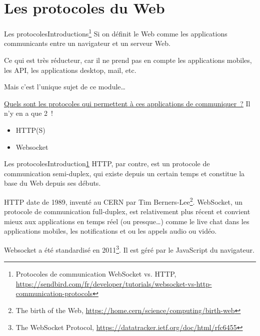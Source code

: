 \documentclass{beamer}
\begin{document}
    \section{Les protocoles du Web}\label{sec:protocoles}

    \begin{frame}{Les protocoles}{Introductions\footnote{\label{sendbird-protocole}Protocoles de communication WebSocket vs. HTTP, \url{https://sendbird.com/fr/developer/tutorials/websocket-vs-http-communication-protocols}}}
        Si on définit le Web comme les applications communicants entre un navigateur et un serveur Web.
        \begin{dangercolorbox}
            Ce qui est très réducteur, car il ne prend pas en compte les applications mobiles, les API, les applications desktop, mail, etc.

            Mais c'est l'unique sujet de ce module\ldots
        \end{dangercolorbox}
        \href{https://app.wooclap.com/events/NUDMYH/questions/68d2fb6cbbf6a5629eb98f90}{Quels sont les protocoles qui permettent à ces applications de communiquer~?}
        \pause
        \bigbreak
        Il n'y en a que 2~!
        \begin{itemize}
            \item HTTP(S)
            \item Websocket
        \end{itemize}
    \end{frame}

    \begin{frame}{Les protocoles}{Introduction\cref{sendbird-protocole}}
        HTTP, par contre, est un protocole de communication semi-duplex, qui existe depuis un certain temps et constitue la base du Web depuis ses débuts.

        HTTP date de 1989, inventé au CERN par Tim Berners-Lee\footnote{The birth of the Web, \url{https://home.cern/science/computing/birth-web}}.
        \bigbreak
        WebSocket, un protocole de communication full-duplex, est relativement plus récent et convient mieux aux applications en temps réel (ou presque\ldots) comme le live chat dans les applications mobiles, les notifications et ou les appels audio ou vidéo.

        Websocket a été standardisé en 2011\footnote{The WebSocket Protocol, \url{https://datatracker.ietf.org/doc/html/rfc6455}}.
        Il est géré par le JavaScript du navigateur.
    \end{frame}
\end{document}
